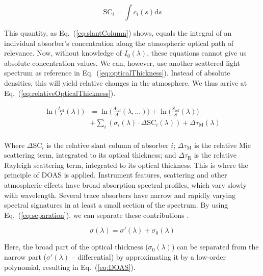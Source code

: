 \begin{equation}
      \label{eq:slantColumn}
      \mathrm{SC}_{i} = \int c_{i}(s)\mathrm{d}s
\end{equation}

This quantity, as Eq.~(\ref{eq:slantColumn}) shows, equals the integral
of an individual absorber's concentration along the atmospheric optical
path of relevance. Now, without knowledge of $I_{0}(\lambda)$, these
equations cannot give us absolute concentration values. We can, however,
use another scattered light spectrum as reference in
Eq.~(\ref{eq:opticalThickness}). Instead of absolute densities, this
will yield relative changes in the atmosphere. We thus arrive at
Eq.~(\ref{eq:relativeOpticalThickness}).

\begin{equation}
    \label{eq:relativeOpticalThickness}
    \begin{aligned}
        \ln\Bigg( \frac{I_\mathrm{ref}}{I}(\lambda) \Bigg) &= 
            \ln\Big( \frac{A_\mathrm{ref}}{A}(\lambda,\ldots) \Big) + \ln\Big( 
                \frac{S_\mathrm{ref}}{S}(\lambda) \Big) \nonumber\\
                                                           &+  \sum_{i} 
            (\sigma_{i}(\lambda) \cdot \Delta \mathrm{SC}_{i}(\lambda)) + 
                \Delta \tau_\mathrm{M}(\lambda) \nonumber\\
    \end{aligned}     
\end{equation}

Where $\Delta \mathrm{SC}_{i}$  is the relative slant column of absorber
$i$; $\Delta \tau_\mathrm{M}$  is the relative Mie scattering term,
integrated to its optical thickness; and $\Delta \tau_\mathrm{R}$ is the
relative Rayleigh scattering term, integrated to its optical thickness.
This is where the principle of DOAS is applied. Instrument features,
scattering and other atmospheric effects have broad absorption spectral
profiles, which vary slowly with wavelength. Several trace absorbers
have narrow and rapidly varying spectral signatures in at least a small
section of the spectrum. By using Eq.~(\ref{eq:separation}), we can
separate these contributions \cite{Danckaert2015}.

\begin{equation}
      \label{eq:separation}
      \sigma(\lambda) = \sigma{'}(\lambda) + \sigma_{0}(\lambda)
\end{equation}

Here, the broad part of the optical thickness ($\sigma_{0}(\lambda)$)
can be separated from the narrow part ($\sigma{'}(\lambda)$ --
differential) by approximating it by a low-order polynomial, resulting
in Eq.~(\ref{eq:DOAS}).

